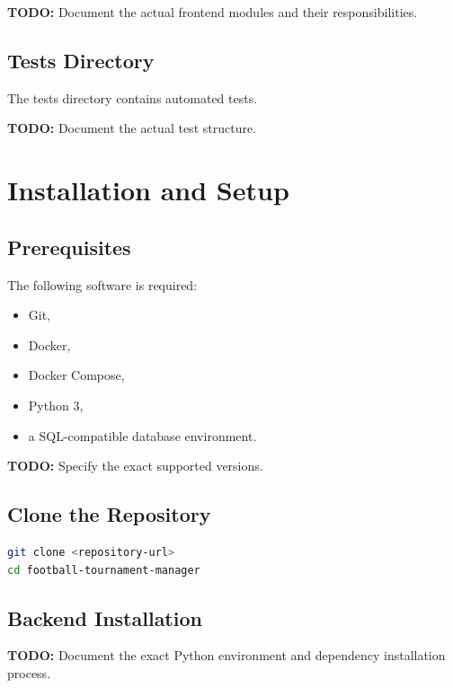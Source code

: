 \documentclass[12pt,a4paper]{article}
\begin{document}
\textbf{TODO:} Document the actual frontend modules and their
responsibilities.

\subsection{Tests Directory}

The tests directory contains automated tests.

\textbf{TODO:} Document the actual test structure.


\section{Installation and Setup}

\subsection{Prerequisites}

The following software is required:

\begin{itemize}
    \item Git,
    \item Docker,
    \item Docker Compose,
    \item Python 3,
    \item a SQL-compatible database environment.
\end{itemize}

\textbf{TODO:} Specify the exact supported versions.

\subsection{Clone the Repository}

\begin{lstlisting}[language=bash]
git clone <repository-url>
cd football-tournament-manager
\end{lstlisting}

\subsection{Backend Installation}

\textbf{TODO:} Document the exact Python environment and dependency
installation process.
\end{document}
